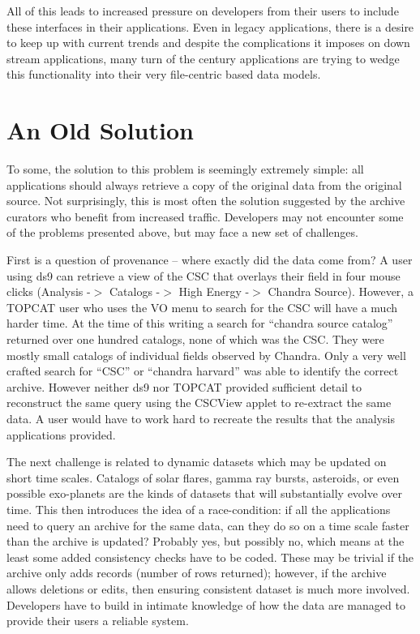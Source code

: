 All of this leads to increased pressure on developers  from their users to include these interfaces in their applications. Even in legacy applications, there is a desire to keep up with current trends and despite the complications it imposes on down stream applications, many turn of the century applications are trying to wedge this functionality into their very file-centric based data models.



\section{An Old Solution}

To some, the solution to this problem is seemingly extremely simple:  all applications should always retrieve a copy of the original data from the original source.  Not surprisingly, this is most often the solution suggested by the archive curators who benefit from increased traffic. Developers may not encounter some of the problems presented above, but may face a new set of challenges.


First is a question of provenance -- where exactly did the data come from? A user using ds9 can retrieve a view of the CSC that overlays their field in four mouse clicks  (Analysis -$>$ Catalogs -$>$ High Energy -$>$ Chandra Source). However, a TOPCAT user who uses the VO menu to search for the CSC will have a much harder time.  At the time of this writing a search for  ``chandra source catalog'' returned over one hundred catalogs, none of which was the CSC.  They were mostly small catalogs of individual fields observed by Chandra.  Only a very well crafted search for ``CSC'' or ``chandra harvard'' was able to identify the correct archive.  However neither ds9 nor TOPCAT provided sufficient detail to reconstruct the same query using the CSCView applet to re-extract the same data.  A user would have to work hard to recreate the results that the analysis applications provided.

The next challenge is related to dynamic datasets which may be updated on short time scales.  Catalogs of solar flares, gamma ray bursts, asteroids, or even possible exo-planets are the kinds of datasets that will substantially evolve over time.  This then introduces the idea of a race-condition:  if all the applications need to query an archive for the same data, can they do so on a time scale faster than the archive is updated?  Probably yes, but possibly no, which means at the least some added consistency checks have to be coded.  These may be trivial if the archive only adds records (number of rows returned); however, if the archive allows deletions or edits, then ensuring consistent dataset is much more involved.  Developers have to build in intimate knowledge of how the data are managed to provide their users a reliable system.

